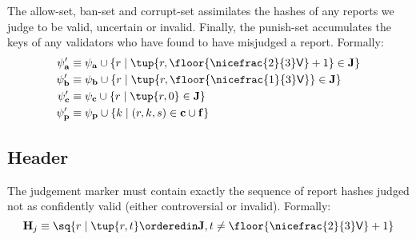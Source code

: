 The allow-set, ban-set and corrupt-set assimilates the hashes of any reports we judge to be valid, uncertain or invalid. Finally, the punish-set accumulates the keys of any validators who have found to have misjudged a report. Formally:
\begin{align}
  \psi'_\mathbf{a} &\equiv \psi_\mathbf{a} \cup \{r \mid \tup{r, \floor{\nicefrac{2}{3}\mathsf{V}} + 1} \in \mathbf{J} \} \\
  \psi'_\mathbf{b} &\equiv \psi_\mathbf{b} \cup \{r \mid \tup{r, \floor{\nicefrac{1}{3}\mathsf{V}}} \in \mathbf{J} \} \\
  \psi'_\mathbf{c} &\equiv \psi_\mathbf{c} \cup \{r \mid \tup{r, 0} \in \mathbf{J} \} \\
  \psi'_\mathbf{p} &\equiv \psi_\mathbf{p} \cup \{ k \mid (r, k, s) \in \mathbf{c} \cup \mathbf{f} \}
\end{align}

\subsection{Header}\label{sec:judgementmarker}

The judgement marker must contain exactly the sequence of report hashes judged not as confidently valid (\ie either controversial or invalid). Formally:
\begin{equation}
  \mathbf{H}_j \equiv \sq{r \mid \tup{r, t} \orderedin \mathbf{J}, t \ne \floor{\nicefrac{2}{3}\mathsf{V}} + 1}
\end{equation}
